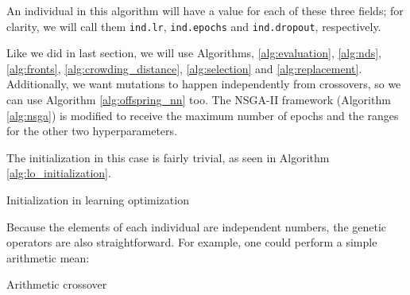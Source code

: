 	An individual in this algorithm will have a value for each of these three fields; for clarity, we will call them \texttt{ind.lr}, \texttt{ind.epochs} and \texttt{ind.dropout}, respectively.

	Like we did in last section, we will use Algorithms, \ref{alg:evaluation}, \ref{alg:nds}, \ref{alg:fronts}, \ref{alg:crowding_distance}, \ref{alg:selection} and \ref{alg:replacement}. Additionally, we want mutations to happen independently from crossovers, so we can use Algorithm \ref{alg:offspring_nn} too. The NSGA-II framework (Algorithm \ref{alg:nsga}) is modified to receive the maximum number of epochs and the ranges for the other two hyperparameters.

	The initialization in this case is fairly trivial, as seen in Algorithm \ref{alg:lo_initialization}.

	\vspace{0.3cm}

	\begin{algorithm}[H]\label{alg:lo_initialization}


		\caption{Initialization in learning optimization}

	\end{algorithm}

	\vspace{0.3cm}

	Because the elements of each individual are independent numbers, the genetic operators are also straightforward. For example, one could perform a simple arithmetic mean:

	\vspace{0.3cm}

	\begin{algorithm}[H]\label{alg:arithmeticx}


		\caption{Arithmetic crossover}

	\end{algorithm}

